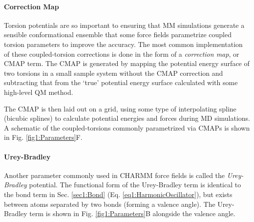 \paragraph{Correction Map}

Torsion potentials are so important to ensuring that MM simulations generate a
sensible conformational ensemble that some force fields parametrize coupled
torsion parameters to improve the accuracy. The most common implementation of
these coupled-torsion corrections is done in the form of a \emph{correction
map}, or CMAP term. \cite{MacKerell_JComputChem_2004_v25_p1400} The CMAP is
generated by mapping the potential energy surface of two torsions in a small
sample system without the CMAP correction and subtracting that from the `true'
potential energy surface calculated with some high-level QM method.

The CMAP is then laid out on a grid, using some type of interpolating spline
(\eg bicubic splines) to calculate potential energies and forces during MD
simulations. A schematic of the coupled-torsions commonly parametrized via CMAPs
is shown in Fig. \ref{fig1:Parameters}F.

\paragraph{Urey-Bradley}

Another parameter commonly used in CHARMM force fields
\cite{MacKerell_JPhysChemB_1998_v102_p3586} is called the \emph{Urey-Bradley}
potential. The functional form of the Urey-Bradley term is identical to the
bond term in Sec. \ref{sec1:Bond} (Eq. \ref{eq1:HarmonicOscillator}), but exists
between atoms separated by two bonds (\ie forming a valence angle). The
Urey-Bradley term is shown in Fig. \ref{fig1:Parameters}B alongside the valence
angle.

